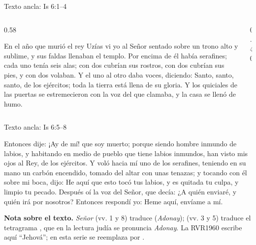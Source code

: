 \begin{frame}{Texto ancla: Is 6:1--4}
\begin{columns}[c,onlytextwidth]
\begin{column}{0.58\textwidth}
\begin{cita}En el año que murió el rey Uzías vi yo al Señor sentado sobre un trono alto y sublime, y sus faldas llenaban el templo. Por encima de él había serafines; cada uno tenía seis alas; con dos cubrían sus rostros, con dos cubrían sus pies, y con dos volaban. Y el uno al otro daba voces, diciendo: Santo, santo, santo, \SENOR{} de los ejércitos; toda la tierra está llena de su gloria. Y los quiciales de las puertas se estremecieron con la voz del que clamaba, y la casa se llenó de humo.\end{cita}
\end{column}
\begin{column}{0.40\textwidth}\end{column}
\end{columns}
\end{frame}

\begin{frame}{Texto ancla: Is 6:5--8}
\begin{cita}Entonces dije: ¡Ay de mí! que soy muerto; porque siendo hombre inmundo de labios, y habitando en medio de pueblo que tiene labios inmundos, han visto mis ojos al Rey, \SENOR{} de los ejércitos. Y voló hacia mí uno de los serafines, teniendo en su mano un carbón encendido, tomado del altar con unas tenazas; y tocando con él sobre mi boca, dijo: He aquí que esto tocó tus labios, y es quitada tu culpa, y limpio tu pecado. Después oí la voz del Señor, que decía: ¿A quién enviaré, y quién irá por nosotros? Entonces respondí yo: Heme aquí, envíame a mí.\end{cita}
\footnotesize\textbf{Nota sobre el texto.} \emph{Señor} (vv. 1 y 8) traduce  (\emph{Adonay}); \SENOR{} (vv. 3 y 5) traduce el tetragrama , que en la lectura judía se pronuncia \emph{Adonay}. La RVR1960 escribe aquí ``Jehová''; en esta serie se reemplaza por \SENOR.
\end{frame}

